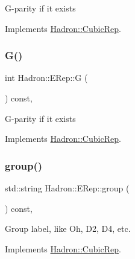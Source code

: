 G-\/parity if it exists 

Implements \mbox{\hyperlink{structHadron_1_1CubicRep_a52104e43266d1614c00bbd1c3b395458}{Hadron\+::\+Cubic\+Rep}}.

\mbox{\label{structHadron_1_1ERep_afc59abdfb3fdbbcddbe2dede52c570a6}} 
\subsubsection{\texorpdfstring{G()}{G()}\hspace{0.1cm}{\footnotesize\ttfamily [2/2]}}
{\footnotesize\ttfamily int Hadron\+::\+E\+Rep\+::G (\begin{DoxyParamCaption}{ }\end{DoxyParamCaption}) const\hspace{0.3cm}{\ttfamily [inline]}, {\ttfamily [virtual]}}

G-\/parity if it exists 

Implements \mbox{\hyperlink{structHadron_1_1CubicRep_a52104e43266d1614c00bbd1c3b395458}{Hadron\+::\+Cubic\+Rep}}.

\mbox{\label{structHadron_1_1ERep_a832687372f6413d24ee1cf8c8b5c5f5f}} 
\subsubsection{\texorpdfstring{group()}{group()}\hspace{0.1cm}{\footnotesize\ttfamily [1/2]}}
{\footnotesize\ttfamily std\+::string Hadron\+::\+E\+Rep\+::group (\begin{DoxyParamCaption}{ }\end{DoxyParamCaption}) const\hspace{0.3cm}{\ttfamily [inline]}, {\ttfamily [virtual]}}

Group label, like Oh, D2, D4, etc. 

Implements \mbox{\hyperlink{structHadron_1_1CubicRep_a0748f11ec87f387062c8e8981339a29c}{Hadron\+::\+Cubic\+Rep}}.

\mbox{\label{structHadron_1_1ERep_a832687372f6413d24ee1cf8c8b5c5f5f}} 
